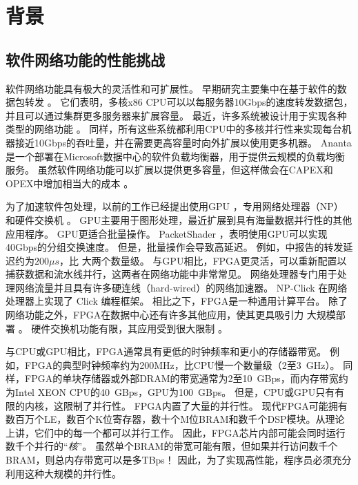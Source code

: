 \section{背景}
\label{clicknp:sec:background}

\subsection{软件网络功能的性能挑战}

软件网络功能具有极大的灵活性和可扩展性。
早期研究主要集中在基于软件的数据包转发 \cite {routebricks,Egi:2008:THP:1544012.1544032}。
它们表明，多核x86 CPU可以以每服务器10Gbps的速度转发数据包，并且可以通过集群更多服务器来扩展容量。
最近，许多系统被设计用于实现各种类型的网络功能 \cite {comb,Greenhalgh:2009:FPR:1517480.1517484,martins2014clickos}。
同样，所有这些系统都利用CPU中的多核并行性来实现每台机器接近10Gbps的吞吐量，并在需要更高容量时向外扩展以使用更多机器。
Ananta \cite {ananta}是一个部署在Microsoft数据中心的软件负载均衡器，用于提供云规模的负载均衡服务。
虽然软件网络功能可以扩展以提供更多容量，但这样做会在CAPEX和OPEX中增加相当大的成本 \cite {ananta,duet}。

为了加速软件包处理，以前的工作已经提出使用GPU \cite {packetshader}，专用网络处理器（NP）\cite {cavium,netronome} 和硬件交换机 \cite {duet}。
GPU主要用于图形处理，最近扩展到具有海量数据并行性的其他应用程序。 GPU更适合批量操作。 PacketShader \cite {packetshader}，表明使用GPU可以实现40Gbps的分组交换速度。
但是，批量操作会导致高延迟。
例如，\cite {packetshader}中报告的转发延迟约为$200 \mu{}s$，比 \name{} 大两个数量级。
与GPU相比，FPGA更灵活，可以重新配置以捕获数据和流水线并行，这两者在网络功能中非常常见。
网络处理器专门用于处理网络流量并且具有许多硬连线（hard-wired）的网络加速器。
NP-Click \cite{shah2004np} 在网络处理器上实现了 Click 编程框架。
相比之下，FPGA是一种通用计算平台。
除了网络功能之外，FPGA在数据中心还有许多其他应用，使其更具吸引力
大规模部署 \cite {putnam2014reconfigurable}。
硬件交换机功能有限，其应用受到很大限制 \cite {duet}。

与CPU或GPU相比，FPGA通常具有更低的时钟频率和更小的存储器带宽。
例如，FPGA的典型时钟频率约为200MHz，比CPU慢一个数量级（2至3~GHz）。
同样，FPGA的单块存储器或外部DRAM的带宽通常为2至10~GBps，而内存带宽约为Intel XEON CPU的40~GBps，GPU为100~GBps。
但是，CPU或GPU只有有限的内核，这限制了并行性。 FPGA内置了大量的并行性。
现代FPGA可能拥有数百万个LE，数百个K位寄存器，数十个M位BRAM和数千个DSP模块。从理论上讲，它们中的每一个都可以并行工作。
因此，FPGA芯片内部可能会同时运行数千个并行的``\textit {核}''。
虽然单个BRAM的带宽可能有限，但如果并行访问数千个BRAM，则总内存带宽可以是多TBps！
因此，为了实现高性能，程序员必须充分利用这种大规模的并行性。

